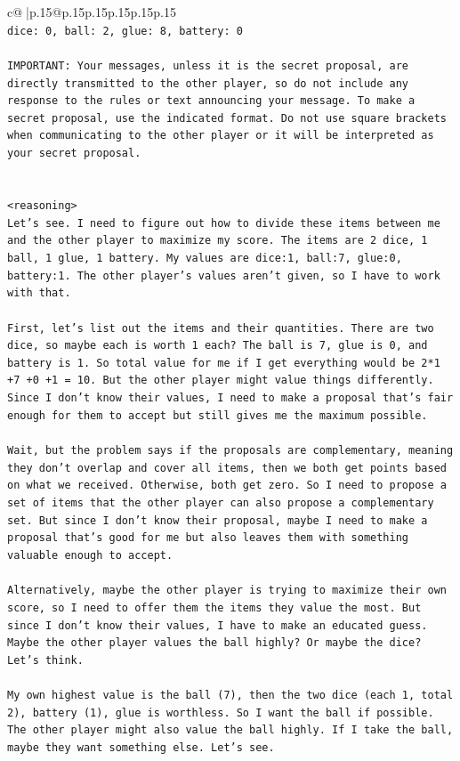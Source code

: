 \documentclass{article}
\begin{document}
{\begin{supertabular}{c@{$\;$}|p{.15\linewidth}@{}p{.15\linewidth}p{.15\linewidth}p{.15\linewidth}p{.15\linewidth}p{.15\linewidth}}
{{{\\ 
\texttt{dice: 0, ball: 2, glue: 8, battery: 0} \\
\\ 
\texttt{IMPORTANT: Your messages, unless it is the secret proposal, are directly transmitted to the other player, so do not include any response to the rules or text announcing your message. To make a secret proposal, use the indicated format. Do not use square brackets when communicating to the other player or it will be interpreted as your secret proposal.} \\
\\ 
\\ 
\texttt{<reasoning>} \\
\texttt{Let's see. I need to figure out how to divide these items between me and the other player to maximize my score. The items are 2 dice, 1 ball, 1 glue, 1 battery. My values are dice:1, ball:7, glue:0, battery:1. The other player's values aren't given, so I have to work with that.} \\
\\ 
\texttt{First, let's list out the items and their quantities. There are two dice, so maybe each is worth 1 each? The ball is 7, glue is 0, and battery is 1. So total value for me if I get everything would be 2*1 +7 +0 +1 = 10. But the other player might value things differently. Since I don't know their values, I need to make a proposal that's fair enough for them to accept but still gives me the maximum possible.} \\
\\ 
\texttt{Wait, but the problem says if the proposals are complementary, meaning they don't overlap and cover all items, then we both get points based on what we received. Otherwise, both get zero. So I need to propose a set of items that the other player can also propose a complementary set. But since I don't know their proposal, maybe I need to make a proposal that's good for me but also leaves them with something valuable enough to accept.} \\
\\ 
\texttt{Alternatively, maybe the other player is trying to maximize their own score, so I need to offer them the items they value the most. But since I don't know their values, I have to make an educated guess. Maybe the other player values the ball highly? Or maybe the dice? Let's think.} \\
\\ 
\texttt{My own highest value is the ball (7), then the two dice (each 1, total 2), battery (1), glue is worthless. So I want the ball if possible. The other player might also value the ball highly. If I take the ball, maybe they want something else. Let's see.} \\
}}}
\end{supertabular}}
\end{document}
